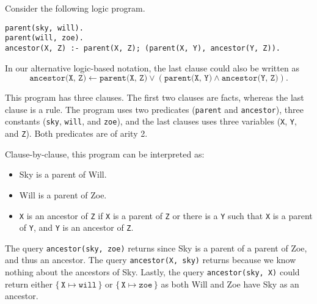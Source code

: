 \begin{example}
  Consider the following logic program.
\begin{verbatim}
parent(sky, will).
parent(will, zoe).
ancestor(X, Z) :- parent(X, Z); (parent(X, Y), ancestor(Y, Z)).
\end{verbatim}
  In our alternative logic-based notation, the last clause could also be written
  as
  \[
    \texttt{ancestor(X, Z)} \gets \texttt{parent(X, Z)} \lor (\texttt{parent(X, Y)} \land \texttt{ancestor(Y, Z)}).
  \]

  This program has three clauses. The first two clauses are facts, whereas the
  last clause is a rule. The program uses two predicates (\texttt{parent} and
  \texttt{ancestor}), three constants (\texttt{sky}, \texttt{will}, and
  \texttt{zoe}), and the last clauses uses three variables (\texttt{X},
  \texttt{Y}, and \texttt{Z}). Both predicates are of arity 2.

  Clause-by-clause, this program can be interpreted as:
  \begin{itemize}
    \item Sky is a parent of Will.
    \item Will is a parent of Zoe.
    \item \texttt{X} is an ancestor of \texttt{Z} if \texttt{X} is a parent of
          \texttt{Z} or there is a \texttt{Y} such that \texttt{X} is a parent
          of \texttt{Y}, and \texttt{Y} is an ancestor of \texttt{Z}.
  \end{itemize}

  The query \texttt{ancestor(sky, zoe)} returns \true{} since Sky is a parent of
  a parent of Zoe, and thus an ancestor. The query \texttt{ancestor(X, sky)}
  returns \false{} because we know nothing about the ancestors of Sky. Lastly,
  the query \texttt{ancestor(sky, X)} could return either
  $\{\, \texttt{X} \mapsto \texttt{will} \,\}$ or
  $\{\, \texttt{X} \mapsto \texttt{zoe} \,\}$ as both Will and Zoe have Sky as
  an ancestor.
\end{example}


